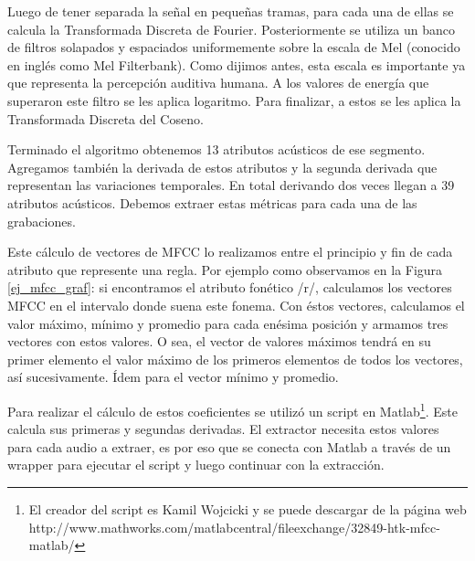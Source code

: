 Luego de tener separada la señal en pequeñas tramas, para cada una de ellas se calcula la Transformada Discreta de Fourier. Posteriormente se utiliza un banco de filtros solapados y espaciados uniformemente sobre la escala de Mel (conocido en inglés como Mel Filterbank). Como dijimos antes, esta escala es importante ya que representa la percepción auditiva humana. A los valores de energía que superaron este filtro se les aplica logaritmo. Para finalizar, a estos se les aplica la Transformada Discreta del Coseno.


Terminado el algoritmo obtenemos 13 atributos acústicos de ese segmento. Agregamos también la derivada de estos atributos y la segunda derivada que representan las variaciones temporales. En total derivando dos veces llegan a 39 atributos acústicos. Debemos extraer estas métricas para cada una de las grabaciones.

Este cálculo de vectores de MFCC lo realizamos entre el principio y fin de cada atributo que represente una regla. Por ejemplo como observamos en la Figura \ref{ej_mfcc_graf}: si encontramos el atributo fonético /r/, calculamos los vectores MFCC en el intervalo donde suena este fonema. Con éstos vectores, calculamos el valor máximo, mínimo y promedio para cada enésima posición y armamos tres vectores con estos valores. O sea, el vector de valores máximos tendrá en su primer elemento el valor máximo de los primeros elementos de todos los vectores, así sucesivamente. Ídem para el vector mínimo y promedio. 

Para realizar el cálculo de estos coeficientes se utilizó un script en Matlab\footnote{El creador del script es Kamil Wojcicki y se puede descargar de la página web http://www.mathworks.com/matlabcentral/fileexchange/32849-htk-mfcc-matlab/}. Este calcula  sus primeras y segundas derivadas. El extractor necesita estos valores para cada audio a extraer, es por eso que se conecta con Matlab a través de un wrapper para ejecutar el script y luego continuar con la extracción.

